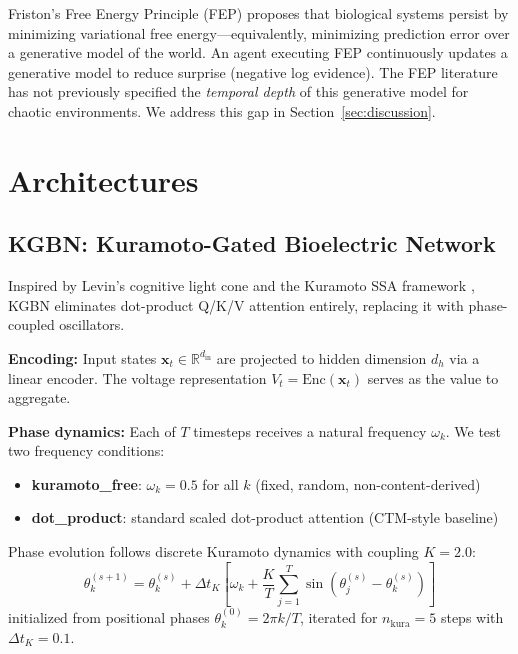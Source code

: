 \documentclass[12pt]{article}
\theoremstyle{definition}
\begin{document}
Friston's Free Energy Principle (FEP) \citep{friston2010free,friston2019free} proposes
that biological systems persist by minimizing variational free energy---equivalently,
minimizing prediction error over a generative model of the world. An agent executing
FEP continuously updates a generative model to reduce surprise (negative log evidence).
The FEP literature has not previously specified the \emph{temporal depth} of this
generative model for chaotic environments. We address this gap in Section~\ref{sec:discussion}.

\section{Architectures}
\label{sec:architectures}

\subsection{KGBN: Kuramoto-Gated Bioelectric Network}

Inspired by Levin's cognitive light cone \citep{levin2019cognitive,levin2022collective}
and the Kuramoto SSA framework \citep{hays2026selective}, KGBN eliminates dot-product
Q/K/V attention entirely, replacing it with phase-coupled oscillators.

\textbf{Encoding:} Input states $\mathbf{x}_t \in \mathbb{R}^{d_{\text{in}}}$ are
projected to hidden dimension $d_h$ via a linear encoder. The voltage representation
$V_t = \text{Enc}(\mathbf{x}_t)$ serves as the value to aggregate.

\textbf{Phase dynamics:} Each of $T$ timesteps receives a natural frequency
$\omega_k$. We test two frequency conditions:
\begin{itemize}
  \item \textbf{kuramoto\_free}: $\omega_k = 0.5$ for all $k$ (fixed, random, non-content-derived)
  \item \textbf{dot\_product}: standard scaled dot-product attention (CTM-style baseline)
\end{itemize}
Phase evolution follows discrete Kuramoto dynamics with coupling $K=2.0$:
\begin{equation}
  \theta_k^{(s+1)} = \theta_k^{(s)} + \Delta t_K \left[\omega_k +
    \frac{K}{T}\sum_{j=1}^{T}\sin(\theta_j^{(s)} - \theta_k^{(s)})\right]
\end{equation}
initialized from positional phases $\theta_k^{(0)} = 2\pi k / T$, iterated for
$n_{\text{kura}} = 5$ steps with $\Delta t_K = 0.1$.
\end{document}
